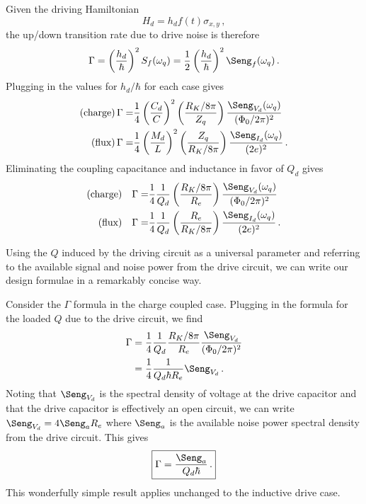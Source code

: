Given the driving Hamiltonian
\begin{displaymath}
  H_d = h_d f(t) \sigma_{x,y} \, ,
\end{displaymath}
the up/down transition rate due to drive noise is therefore
\begin{equation*}
  \Gamma = \left( \frac{h_d}{\hbar} \right)^2 S_f(\omega_q) = \frac{1}{2} \left( \frac{h_d}{\hbar} \right)^2 \Seng_f(\omega_q) \, .
\end{equation*}
Plugging in the values for $h_d/\hbar$ for each case gives
\begin{align*}
  \text{(charge)} \, \Gamma =&
    \frac{1}{4} \left( \frac{C_d}{C} \right)^2
    \left( \frac{R_K/8\pi}{Z_q} \right) \frac{\Seng_{V_d}(\omega_q)}{(\Phi_0/2\pi)^2} \\
  \text{(flux)} \, \Gamma =&
    \frac{1}{4} \left( \frac{M_d}{L} \right)^2
    \left( \frac{Z_q}{R_K/8\pi} \right) \frac{\Seng_{I_d}(\omega_q)}{(2e)^2} \, .
\end{align*}
Eliminating the coupling capacitance and inductance in favor of $Q_d$ gives
\begin{align}
  \text{(charge)} \quad \Gamma
  =& \frac{1}{4} \frac{1}{Q_d}
  \left( \frac{R_K/8\pi}{R_e}\right) \frac{\Seng_{V_d}(\omega_q)}{(\Phi_0/2\pi)^2} \\
  \text{(flux)} \quad \Gamma
  =& \frac{1}{4} \frac{1}{Q_d} \left( \frac{R_e}{R_K/8\pi} \right) \frac{\Seng_{I_d}(\omega_q)}{(2e)^2} \, .
\end{align}


Using the $Q$ induced by the driving circuit as a universal parameter and referring to the available signal and noise power from the drive circuit, we can write our design formulae in a remarkably concise way.

Consider the $\Gamma$ formula in the charge coupled case.
Plugging in the formula for the loaded $Q$ due to the drive circuit, we find
\begin{align*}
  \Gamma
  & = \frac{1}{4} \frac{1}{Q_d} \frac{R_K / 8\pi}{R_e} \frac{\Seng_{V_d}}{(\Phi_0 / 2\pi)^2} \\
  & = \frac{1}{4} \frac{1}{Q_d \hbar R_e} \Seng_{V_d} \, .
\end{align*}
Noting that $\Seng_{V_d}$ is the spectral density of voltage at the drive capacitor and that the drive capacitor is effectively an open circuit, we can write $\Seng_{V_d} = 4 \Seng_a R_e$ where $\Seng_a$ is the available noise power spectral density from the drive circuit.
This gives
\begin{equation}
  \boxed{\Gamma = \frac{\Seng_a}{Q_d \hbar} \, .}
\end{equation}
This wonderfully simple result applies unchanged to the inductive drive case.

